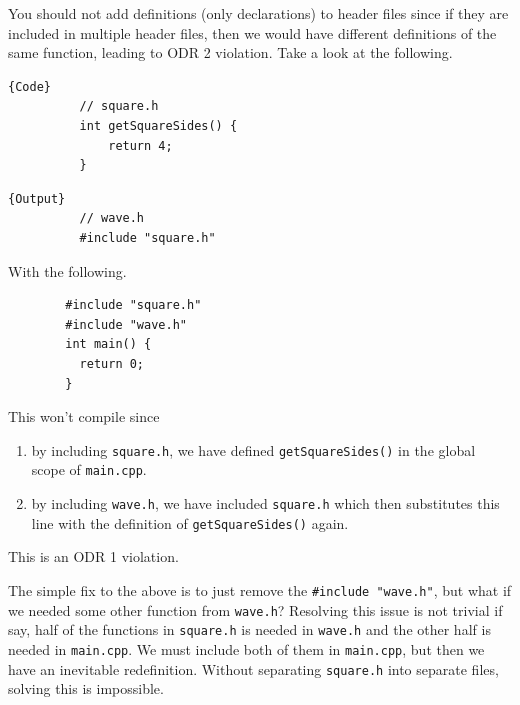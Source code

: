 \documentclass{article}
\newcounter{definition}[section]
\newcounter{example}[section]
\begin{document}
    \begin{example}
      \label{ex:definitions-inside-header-files}
      You should not add definitions (only declarations) to header files since if they are included in multiple header files, then we would have different definitions of the same function, leading to ODR 2 violation. Take a look at the following. 
      
      \noindent\begin{minipage}{.5\textwidth}
        \begin{lstlisting}[]{Code}
          // square.h
          int getSquareSides() {
              return 4;
          } 
        \end{lstlisting}
        \end{minipage}
        \hfill
        \begin{minipage}{.49\textwidth}
        \begin{lstlisting}[]{Output}
          // wave.h 
          #include "square.h"
        \end{lstlisting}
      \end{minipage}

      With the following. 
      \begin{lstlisting}
        #include "square.h"
        #include "wave.h" 
        int main() {
          return 0;
        }
      \end{lstlisting}
      This won't compile since 
      \begin{enumerate}
        \item by including \texttt{square.h}, we have defined \texttt{getSquareSides()} in the global scope of \texttt{main.cpp}. 
        \item by including \texttt{wave.h}, we have included \texttt{square.h} which then substitutes this line with the definition of \texttt{getSquareSides()} again. 
      \end{enumerate}
      This is an ODR 1 violation. 
    \end{example} 

    The simple fix to the above is to just remove the \texttt{\#include "wave.h"}, but what if we needed some other function from \texttt{wave.h}? Resolving this issue is not trivial if say, half of the functions in \texttt{square.h} is needed in \texttt{wave.h} and the other half is needed in \texttt{main.cpp}. We must include both of them in \texttt{main.cpp}, but then we have an inevitable redefinition. Without separating \texttt{square.h} into separate files, solving this is impossible. 
\end{document}
